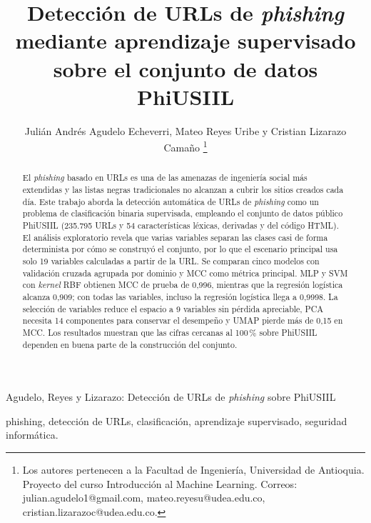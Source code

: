\documentclass[journal]{IEEEtran}
\begin{document}
\title{Detección de URLs de \textit{phishing} mediante aprendizaje supervisado sobre el conjunto de datos PhiUSIIL}

\author{Julián Andrés Agudelo Echeverri, Mateo Reyes Uribe y Cristian Lizarazo Camaño%
\thanks{Los autores pertenecen a la Facultad de Ingeniería, Universidad de Antioquia. Proyecto del
curso Introducción al Machine Learning. Correos: julian.agudelo1@gmail.com,
mateo.reyesu@udea.edu.co, cristian.lizarazoc@udea.edu.co.}}

%
{Agudelo, Reyes y Lizarazo: Detección de URLs de \textit{phishing} sobre PhiUSIIL}

\maketitle

\begin{abstract}
El \textit{phishing} basado en URLs es una de las amenazas de ingeniería social más
extendidas y las listas negras tradicionales no alcanzan a cubrir los sitios creados
cada día. Este trabajo aborda la detección automática de URLs de \textit{phishing} como
un problema de clasificación binaria supervisada, empleando el conjunto de datos público
PhiUSIIL (235.795 URLs y 54 características léxicas, derivadas y del código HTML). El análisis
exploratorio revela que varias variables separan las clases casi de forma determinista por cómo
se construyó el conjunto, por lo que el escenario principal usa solo 19 variables calculadas a
partir de la URL. Se comparan cinco modelos con validación cruzada agrupada por dominio y MCC como
métrica principal. MLP y SVM con \textit{kernel} RBF obtienen MCC de prueba de 0,996, mientras que
la regresión logística alcanza 0,909; con todas las variables, incluso la regresión logística
llega a 0,9998. La selección de variables reduce el espacio a 9 variables sin pérdida apreciable,
PCA necesita 14 componentes para conservar el desempeño y UMAP pierde más de 0,15 en MCC. Los
resultados muestran que las cifras cercanas al 100\,\% sobre PhiUSIIL dependen en buena parte de la
construcción del conjunto.
\end{abstract}

\begin{IEEEkeywords}
phishing, detección de URLs, clasificación, aprendizaje supervisado, seguridad informática.
\end{IEEEkeywords}

\end{document}
